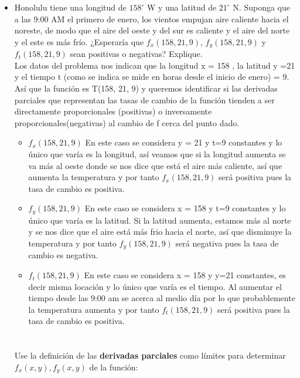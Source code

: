 \documentclass[12pt]{article}
\begin{document}
\begin{itemize}[format=\textbf]
\item Honolulu tiene una longitud de $158^{\circ}$ W y una latitud de $21^{\circ}$ N. Suponga que a las 9:00 AM el primero de enero, los vientos empujan aire caliente hacia el noreste, de modo que el aire del oeste y del sur es caliente y el aire del norte y el este es más frío. ¿Esperaría que $f_x(158, 21, 9)$, $f_y(158, 21, 9)$ y $f_t(158, 21, 9)$ sean positivas o
negativas? Explique.\\
Los datos del problema nos indican que la longitud x = 158 , la latitud y =21 y el tiempo t (como se indica se mide en horas desde el inicio de enero) = 9. Así que la función es T(158, 21, 9) y queremos identificar si las derivadas parciales que representan las tasas de cambio de la función tienden a ser directamente proporcionales (positivas) o inversamente proporcionales(negativas) al cambio de f cerca del punto dado. \\
\begin{itemize}
\item  $f_x(158, 21, 9)$
  En este caso se considera y = 21 y t=9 constantes y lo único que varía es la longitud, así veamos que si la longitud aumenta se va más al oeste donde se nos dice que está el aire más caliente, así que aumenta la temperatura y por tanto $f_x(158, 21, 9)$ será positiva pues la tasa de cambio es positiva.
\item $f_y(158, 21, 9)$
En este caso se considera x = 158 y t=9 constantes y lo único que varía es la latitud. Si la latitud aumenta, estamos más al norte y se nos dice que el aire está más frio hacia el norte, así que disminuye la temperatura y por tanto $f_y(158, 21, 9)$ será negativa pues la tasa de cambio es negativa.
\item $f_t(158, 21, 9)$
  En este caso se considera x = 158 y y=21 constantes, es decir misma locación y lo único que varía es el tiempo. Al aumentar el tiempo desde las 9:00 am se acerca al medio día por lo que probablemente la temperatura aumenta y por tanto  $f_t(158, 21, 9)$ será positiva pues la tasa de cambio es positiva.
  \end{itemize} 
\section{}

Use la definición de las \textbf{derivadas parciales} como límites para determinar $f_x(x, y), f_y(x, y)$ de la función:


\end{itemize}
\end{document}
